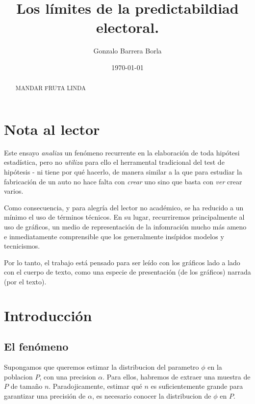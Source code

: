 \documentclass[12pt, a4paper]{article}
\begin{document}
\title{Los l\'imites de la predictabildiad electoral.}
\author{Gonzalo Barrera Borla}
\date{\today}

\maketitle

\pagebreak

\begin{abstract}
MANDAR FRUTA LINDA 
\end{abstract}

\pagebreak


\section{Nota al lector}
Este ensayo \emph{analiza} un fen\'omeno recurrente en la elaboraci\'on de toda hip\'otesi estad\'istica, pero no \emph{utiliza} para ello el herramental tradicional del test de hip\'otesis - ni tiene por qu\'e hacerlo, de manera similar a la que para estudiar la fabricaci\'on de un auto no hace falta con \emph{crear} uno sino que basta con \emph{ver} crear varios.

Como consecuencia, y para alegr\'ia del lector no acad\'emico, se ha reducido a un m\'inimo el uso de t\'erminos t\'ecnicos. En su lugar, recurriremos principalmente al uso de gr\'aficos, un medio de representaci\'on de la infomraci\'on mucho m\'as ameno e inmediatamente comprensible que los generalmente ins\'ipidos modelos y tecnicismos.

Por lo tanto, el trabajo est\'a pensado para ser le\'ido con los gr\'aficos lado a lado con el cuerpo de texto, como una especie de presentaci\'on (de los gr\'aficos) narrada (por el texto).  

\pagebreak

\tableofcontents

\pagebreak

\section{Introducci\'on}
\subsection{El fen\'omeno}
Supongamos que queremos estimar la distribucion del parametro $\phi$ en la poblacion $P$, con una precision $\alpha$. Para ellos, habremos de extraer una muestra de $P$ de tama\~no $n$. Paradojicamente, estimar qu\'e $n$ es suficientemente grande para garantizar una precisi\'on de $\alpha$, es necesario conocer la distribucion de $\phi$ en $P$.
\end{document}
